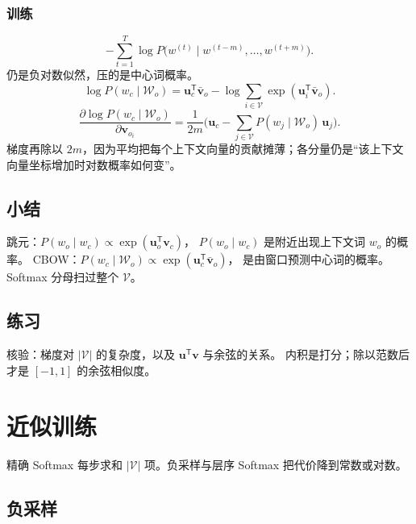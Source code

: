 \subsubsection{训练}

\[
-\sum_{t=1}^{T}
\log P\bigl(w^{(t)}\mid w^{(t-m)},\ldots,w^{(t+m)}\bigr).
\]
仍是负对数似然，压的是中心词概率。
\[
\log P(w_c\mid\mathcal{W}_o)
=
\bm{u}_c^{\mathsf T}\bar{\bm{v}}_o
-\log\sum_{i\in\mathcal{V}}\exp(\bm{u}_i^{\mathsf T}\bar{\bm{v}}_o).
\]
\[
\frac{\partial\log P(w_c\mid\mathcal{W}_o)}{\partial\bm{v}_{o_i}}
=
\frac1{2m}
\Biggl(
\bm{u}_c-\sum_{j\in\mathcal{V}}P(w_j\mid\mathcal{W}_o)\,\bm{u}_j
\Biggr).
\]
梯度再除以 $2m$，因为平均把每个上下文向量的贡献摊薄；各分量仍是“该上下文向量坐标增加时对数概率如何变”。

\subsection{小结}

跳元：$P(w_o\mid w_c)\propto\exp(\bm{u}_o^{\mathsf T}\bm{v}_c)$，
$P(w_o\mid w_c)$ 是附近出现上下文词 $w_o$ 的概率。
CBOW：$P(w_c\mid\mathcal{W}_o)\propto\exp(\bm{u}_c^{\mathsf T}\bar{\bm{v}}_o)$，
是由窗口预测中心词的概率。
Softmax 分母扫过整个 $\mathcal{V}$。

\subsection{练习}

核验：梯度对 $|\mathcal{V}|$ 的复杂度，以及 $\bm{u}^{\mathsf T}\bm{v}$ 与余弦的关系。
内积是打分；除以范数后才是 $[-1,1]$ 的余弦相似度。

\section{近似训练}



精确 Softmax 每步求和 $|\mathcal{V}|$ 项。负采样与层序 Softmax 把代价降到常数或对数。

\subsection{负采样}

